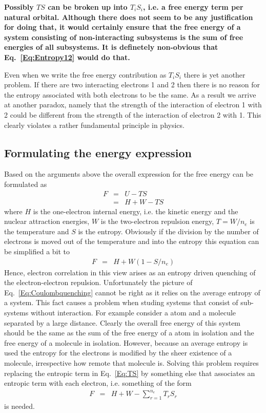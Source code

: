 \documentclass[pra]{revtex4-1}
\begin{document}
{\bf Possibly $TS$ can be broken up into $T_iS_i$, i.e. a free energy term 
per natural orbital. Although there does not seem to be any justification for
doing that, it would certainly ensure that the free energy of a system 
consisting of non-interacting subsystems is the sum of free energies of all 
subsystems. It is definetely non-obvious that Eq.~\ref{Eq:Entropy12} would
do that. 

Even when we write the free energy contribution as $T_iS_i$ there is yet 
another problem. If there are two interacting electrons 1 and 2 then there
is no reason for the entropy associated with both electrons to be the same.
As a result we arrive at another paradox, namely that the strength of the
interaction of electron 1 with 2 could be different from the strength
of the interaction of electron 2 with 1. This clearly violates a rather
fundamental principle in physics.}

\subsection{Formulating the energy expression}

Based on the arguments above the overall expression for the free energy can
be formulated as
\begin{eqnarray}
   F &=& U-TS \\
     &=& H+W-TS
   \label{Eq:TS}
\end{eqnarray}
where $H$ is the one-electron internal energy, i.e. the kinetic energy and the
nuclear attraction energies, $W$ is the two-electron repulsion energy, 
$T=W/n_e$ is the temperature and $S$ is the entropy. Obviously if the division
by the number of electrons is moved out of the temperature and into the 
entropy this equation can be simplified a bit to
\begin{eqnarray}
   F &=& H+W(1-S/n_e)
   \label{Eq:Coulombquenching}
\end{eqnarray}
Hence, electron correlation in this view arises as an entropy driven quenching
of the electron-electron repulsion. Unfortunately the picture of 
Eq.~\ref{Eq:Coulombquenching} cannot be right as it relies on the average entropy
of a system. This fact causes a problem when studing systems that consist of 
sub-systems without interaction. For example consider a  atom and a 
 molecule separated by a large distance. Clearly the overall free energy
of this system should be the same as the sum of the free energy of a  atom in
isolation and the free energy of a  molecule in isolation. However, because 
an average entropy is used the entropy for the  electrons is modified by the
sheer existence of a  molecule, irrespective how remote that molecule is.
Solving this problem requires replacing the entropic term in Eq.~\ref{Eq:TS} by 
something else that associates an entropic term with each electron, i.e. something
of the form
\begin{eqnarray}
   F &=& H+W-\sum_{r=1}^{n_e}T_rS_r
   \label{Eq:TrSr}
\end{eqnarray}
is needed.
\end{document}
